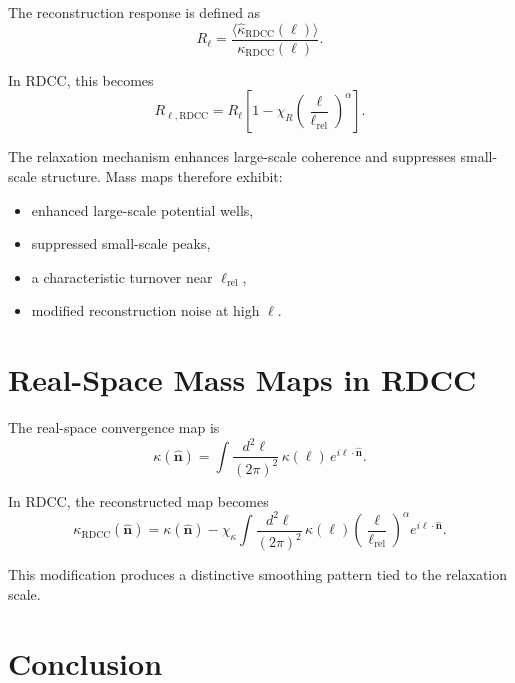 \documentclass[11pt,a4paper]{article}
\begin{document}
The reconstruction response is defined as
\begin{equation}
    R_{\ell}
    = \frac{\langle \hat{\kappa}_{\mathrm{RDCC}}(\ell) \rangle}
           {\kappa_{\mathrm{RDCC}}(\ell)}.
\end{equation}

In RDCC, this becomes
\begin{equation}
    R_{\ell,\mathrm{RDCC}}
    = R_{\ell}
      \left[
        1 - \chi_{R}
        \left(\frac{\ell}{\ell_{\mathrm{rel}}}\right)^{\alpha}
      \right].
\end{equation}

The relaxation mechanism enhances large-scale coherence and suppresses small-scale 
structure. Mass maps therefore exhibit:

\begin{itemize}
    \item enhanced large-scale potential wells,
    \item suppressed small-scale peaks,
    \item a characteristic turnover near $\ell_{\mathrm{rel}}$,
    \item modified reconstruction noise at high $\ell$.
\end{itemize}
\section{Real-Space Mass Maps in RDCC}

The real-space convergence map is
\begin{equation}
    \kappa(\hat{\mathbf{n}})
    = \int \frac{d^{2}\ell}{(2\pi)^{2}}\,
      \kappa(\ell)\,
      e^{i\ell\cdot\hat{\mathbf{n}}}.
\end{equation}

In RDCC, the reconstructed map becomes
\begin{equation}
    \kappa_{\mathrm{RDCC}}(\hat{\mathbf{n}})
    = \kappa(\hat{\mathbf{n}})
      - \chi_{\kappa}
        \int \frac{d^{2}\ell}{(2\pi)^{2}}\,
        \kappa(\ell)
        \left(\frac{\ell}{\ell_{\mathrm{rel}}}\right)^{\alpha}
        e^{i\ell\cdot\hat{\mathbf{n}}}.
\end{equation}

This modification produces a distinctive smoothing pattern tied to the relaxation 
scale.
\section{Conclusion}
\end{document}
